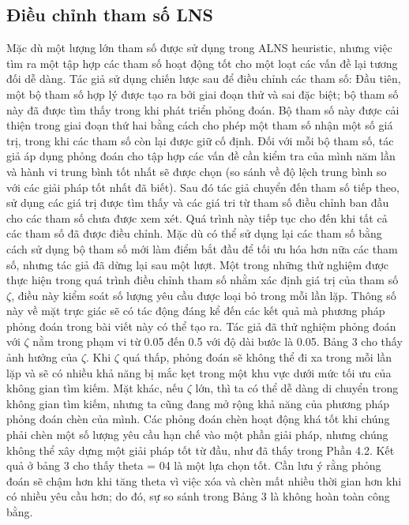 \subsection{Điều chỉnh tham số LNS}
Mặc dù một lượng lớn tham số được sử dụng trong ALNS heuristic, nhưng việc tìm ra một tập hợp các tham số hoạt động tốt cho một loạt các vấn đề lại tương đối dễ dàng. Tác giả sử dụng chiến lược sau để điều chỉnh các tham số: Đầu tiên, một bộ tham số hợp lý được tạo ra bởi giai đoạn thử và sai đặc biệt; bộ tham số này đã được tìm thấy trong khi phát triển phỏng đoán. Bộ tham số này được cải thiện trong giai đoạn thứ hai bằng cách cho phép một tham số nhận một số giá trị, trong khi các tham số còn lại được giữ cố định. Đối với mỗi bộ tham số, tác giả áp dụng phỏng đoán cho tập hợp các vấn đề cần kiểm tra của mình năm lần và hành vi trung bình tốt nhất sẽ được chọn (so sánh về độ lệch trung bình so với các giải pháp tốt nhất đã biết). Sau đó tác giả chuyển đến tham số tiếp theo, sử dụng các giá trị được tìm thấy và các giá tri từ tham số điều chỉnh ban đầu cho các tham số chưa được xem xét. Quá trình này tiếp tục cho đến khi tất cả các tham số đã được điều chỉnh. Mặc dù có thể sử dụng lại các tham số bằng cách sử dụng bộ tham số mới làm điểm bắt đầu để tối ưu hóa hơn nữa các tham số, nhưng tác giả đã dừng lại sau một lượt.
Một trong những thử nghiệm được thực hiện trong quá trình điều chỉnh tham số nhằm xác định giá trị của tham số $\zeta$, điều này kiểm soát số lượng yêu cầu được loại bỏ trong mỗi lần lặp. Thông số này về mặt trực giác sẽ có tác động đáng kể đến các kết quả mà phương pháp phỏng đoán trong bài viết này có thể tạo ra. Tác giả đã thử nghiệm phỏng đoán với $\zeta$ nằm trong phạm vi từ 0.05 đến 0.5 với độ dài bước là 0.05. Bảng 3 cho thấy ảnh hưởng của $\zeta$.  Khi $\zeta$ quá thấp, phỏng đoán sẽ không thể đi xa trong mỗi lần lặp và sẽ có nhiều khả năng bị mắc kẹt trong một khu vực dưới mức tối ưu của không gian tìm kiếm. Mặt khác, nếu $\zeta$ lớn, thì ta có thể dễ dàng di chuyển trong không gian tìm kiếm, nhưng ta cũng đang mở rộng khả năng của phương pháp phỏng đoán chèn của mình. Các phỏng đoán chèn hoạt động khá tốt khi chúng phải chèn một số lượng yêu cầu hạn chế vào một phần giải pháp, nhưng chúng không thể xây dựng một giải pháp tốt từ đầu, như đã thấy trong Phần 4.2. Kết quả ở bảng 3 cho thấy theta = 04 là một lựa chọn tốt. Cần lưu ý rằng phỏng đoán sẽ chậm hơn khi tăng theta vì việc xóa và chèn mất nhiều thời gian hơn khi có nhiều yêu cầu hơn; do đó, sự so sánh trong Bảng 3 là không hoàn toàn công bằng.
